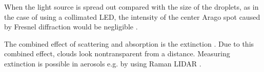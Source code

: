 When the light source is spread out compared with the size of the droplets, as in the case of using a collimated LED, the intensity of the center Arago spot caused by Fresnel diffraction would be negligible \cite{reis2017}.

The combined effect of scattering and absorption is the extinction \cite{bohr2008}. Due to this combined effect, clouds look nontransparent from a distance. Measuring extinction is possible in aerosols e.g. by using Raman LIDAR \cite{ans1990}.

